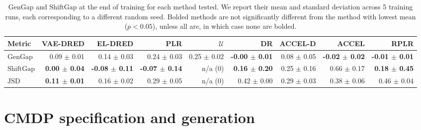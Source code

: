 \begin{table}[H]
\caption{$\text{GenGap}$ and $\text{ShiftGap}$ at the end of training for each method tested. We report their mean and standard deviation across 5 training runs, each corresponding to a different random seed. Bolded methods are not significantly different from the method with lowest mean ($p<0.05$), unless all are, in which case none are bolded.}
\label{c3:tb:minigrid_gen_metrics}
\vskip 0.15in
\begin{center}
\begin{small}
\begin{sc}
\tabcolsep=0.11cm
\begin{adjustbox}{max width=\linewidth}
\begin{tabular}{lrrrrrrrr}
\toprule
           Metric &                  VAE-DRED &                   EL-DRED &                       PLR &            $\mathcal{U}$ &                        DR &         ACCEL-D &                     ACCEL &                      RPLR \\
\midrule
  $\text{GenGap}$ &           0.09 $\pm$ 0.01 &           0.14 $\pm$ 0.03 &           0.24 $\pm$ 0.03 &          0.25 $\pm$ 0.02 & \textbf{-0.00 $\pm$ 0.01} & 0.08 $\pm$ 0.05 & \textbf{-0.02 $\pm$ 0.02} & \textbf{-0.01 $\pm$ 0.01} \\
$\text{ShiftGap}$ & \textbf{0.00 $\pm$ 0.04} & \textbf{-0.08 $\pm$ 0.11} & \textbf{-0.07 $\pm$ 0.14} & n/a (0) &  \textbf{0.16 $\pm$ 0.20} & 0.25 $\pm$ 0.16 &           0.66 $\pm$ 0.17 &  \textbf{0.18 $\pm$ 0.45} \\
     $\text{JSD}$ &           \textbf{0.11 $\pm$ 0.01} &           0.16 $\pm$ 0.02 &           0.29 $\pm$ 0.05 & n/a (0) &           0.42 $\pm$ 0.00 & 0.29 $\pm$ 0.03 &           0.38 $\pm$ 0.06 &           0.46 $\pm$ 0.04 \\
\bottomrule
\end{tabular}
\end{adjustbox}
\end{sc}
\end{small}
\end{center}
\vskip -0.1in
\end{table}


\section{CMDP specification and generation}\label{c3:app:cmdp_levelset}


